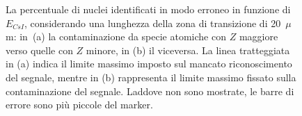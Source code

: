 \begin{figure}[!p] 
	\centering
	\hspace{10mm}
	\caption{La percentuale di nuclei identificati in modo erroneo in funzione di $E_{CsI}$, considerando una lunghezza della zona di transizione di 20~$\mu$m: in~(a) la contaminazione da specie atomiche con $Z$ maggiore verso quelle con $Z$ minore, in (b) il viceversa. La linea tratteggiata in (a) indica il limite massimo imposto sul mancato riconoscimento del segnale, mentre in (b) rappresenta il limite massimo fissato sulla contaminazione del segnale. Laddove non sono mostrate, le barre di errore sono più piccole del marker.} \label{fig:leakage_res_20um}
\end{figure}


